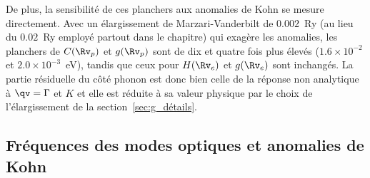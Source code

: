 De plus, la sensibilité de ces planchers aux anomalies de Kohn se mesure directement. Avec un élargissement de Marzari-Vanderbilt de $0.002$~Ry (au lieu du $0.02$~Ry employé partout dans le chapitre) qui exagère les anomalies, les planchers de $C(\Rv_p)$ et $g(\Rv_p)$ sont de dix et quatre fois plus élevés ($1.6\times 10^{-2}$ et $2.0\times 10^{-3}$~eV), tandis que ceux pour $H(\Rv_e)$ et $g(\Rv_e)$ sont inchangés. La partie résiduelle du côté phonon est donc bien celle de la réponse non analytique à $\qv=\Gamma$ et $K$ et elle est réduite à sa valeur physique par le choix de l'élargissement de la section~\ref{sec:g_détails}.

\subsection{Fréquences des modes optiques et anomalies de Kohn}\label{ssec:g_fréquences}

